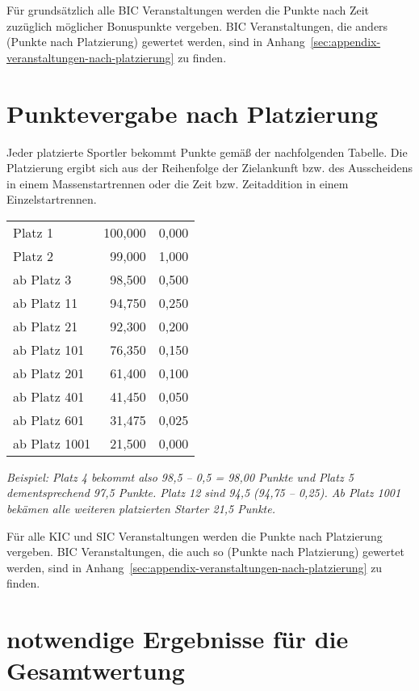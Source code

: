 Für grundsätzlich alle BIC Veranstaltungen werden die Punkte nach Zeit zuzüglich möglicher Bonuspunkte vergeben. BIC Veranstaltungen, die anders (Punkte nach Platzierung) gewertet werden, sind in Anhang~\ref{sec:appendix-veranstaltungen-nach-platzierung} zu finden.

\section{Punktevergabe nach Platzierung}
\label{sec:appendix-punkte-nach-platz}
Jeder platzierte Sportler bekommt Punkte gemäß der nachfolgenden Tabelle. Die Platzierung ergibt sich aus der Reihenfolge der Zielankunft bzw. des Ausscheidens in einem Massenstartrennen oder die Zeit bzw. Zeitaddition in einem Einzelstartrennen.

\begin{center}
\begin{tabular}{|l|r|r|}
	\hline
	\thead{Platz} &
	\thead{Punkte} &
	\thead{Abstand pro Platz} \\ \hline
	Platz 1       & 100,000 & 0,000 \\ \hline
	Platz 2       &  99,000 & 1,000 \\ \hline
	ab Platz 3    &  98,500 & 0,500 \\ \hline
	ab Platz 11   &  94,750 & 0,250 \\ \hline
	ab Platz 21   &  92,300 & 0,200 \\ \hline
	ab Platz 101  &  76,350 & 0,150 \\ \hline
	ab Platz 201  &  61,400 & 0,100 \\ \hline
	ab Platz 401  &  41,450 & 0,050 \\ \hline
	ab Platz 601  &  31,475 & 0,025 \\ \hline
	ab Platz 1001 &  21,500 & 0,000 \\ \hline
\end{tabular}
\end{center}

\textit{Beispiel: Platz 4 bekommt also 98,5 – 0,5 = 98,00 Punkte und Platz 5 dementsprechend 97,5 Punkte. Platz 12 sind 94,5 (94,75 – 0,25). Ab Platz 1001 bekämen alle weiteren platzierten Starter 21,5 Punkte.}

Für alle KIC und SIC Veranstaltungen werden die Punkte nach Platzierung vergeben. BIC Veranstaltungen, die auch so (Punkte nach Platzierung) gewertet werden, sind in Anhang~\ref{sec:appendix-veranstaltungen-nach-platzierung} zu finden.

\section{notwendige Ergebnisse für die Gesamtwertung}
\label{sec:appendix-notwendige-ergebnisse}
